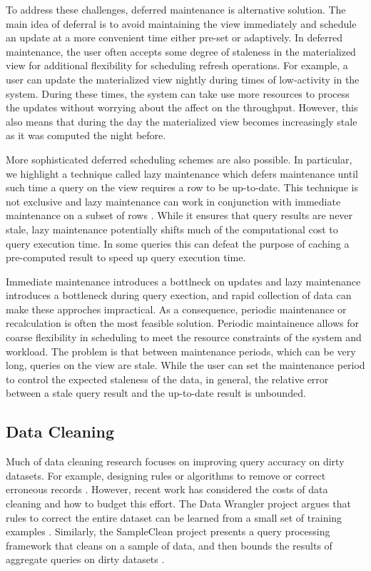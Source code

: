 To address these challenges, deferred maintenance is alternative solution.
The main idea of deferral is to avoid maintaining the view immediately and schedule an update at a more convenient time either pre-set or adaptively.
In deferred maintenance, the user often accepts some degree of staleness in 
the materialized view for additional flexibility for scheduling refresh operations.
For example, a user can update the materialized view nightly during times of low-activity in the system.
During these times, the system can take use more resources to process the updates without worrying about the affect on the throughput.
However, this also means that during the day the materialized view becomes increasingly stale as it was computed the night before.

More sophisticated deferred scheduling schemes are also possible.
In particular, we highlight a technique called lazy maintenance which defers maintenance until such time
a query on the view requires a row to be up-to-date.
This technique is not exclusive and lazy maintenance can work in conjunction with immediate maintenance on a subset of rows \cite{zhou2007lazy}.
While it ensures that query results are never stale, lazy maintenance potentially shifts much of the computational cost to query execution time.
In some queries this can defeat the purpose of caching a pre-computed result to speed up query execution time.

Immediate maintenance introduces a bottlneck on updates and lazy maintenance introduces a bottleneck during query exection,
and rapid collection of data can make these approches impractical.
As a consequence, periodic maintenance or recalculation is often the most feasible solution.
Periodic maintainence allows for coarse flexibility in scheduling to meet the resource constraints of the system and workload.
The problem is that between maintenance periods, which can be very long, queries on the view are stale.
While the user can set the maintenance period to control the expected staleness of the data, in general, the relative error between a stale query result and the up-to-date result is unbounded.

\subsection{Data Cleaning}
Much of data cleaning research focuses on improving query accuracy on dirty datasets.
For example, designing rules or algorithms to remove or correct erroneous records \cite{rahm2000data}.
However, recent work has considered the costs of data cleaning and how to budget this effort.
The Data Wrangler project argues that rules to correct the entire dataset can be learned from a small set of training examples \cite{kandel2011wrangler}.
Similarly, the SampleClean project presents a query processing framework that cleans on a sample of data, and then bounds the results of aggregate queries on dirty datasets \cite{wang1999sample}.

